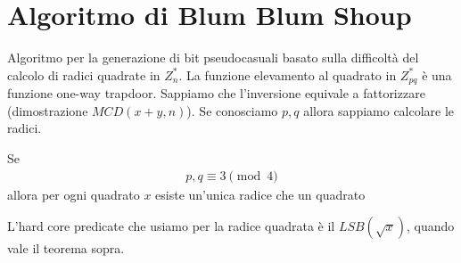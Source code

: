 \section{Algoritmo di Blum Blum Shoup}
Algoritmo per la generazione di bit pseudocasuali basato sulla difficoltà del calcolo di radici quadrate in $Z_n^*$. La funzione elevamento al quadrato in $Z_{pq}^*$ è una funzione one-way trapdoor. Sappiamo che l'inversione equivale a fattorizzare (dimostrazione $MCD(x+y, n)$). Se conosciamo $p, q$ allora sappiamo calcolare le radici.

\begin{theorem}
    Se 
    \begin{align*}
        p, q \equiv 3 \pmod 4
    \end{align*}
    \noindent allora per ogni quadrato $x$ esiste un'unica radice che un quadrato
\end{theorem}

\noindent L'hard core predicate che usiamo per la radice quadrata è il $LSB(\sqrt{x})$, quando vale il teorema sopra.\\

